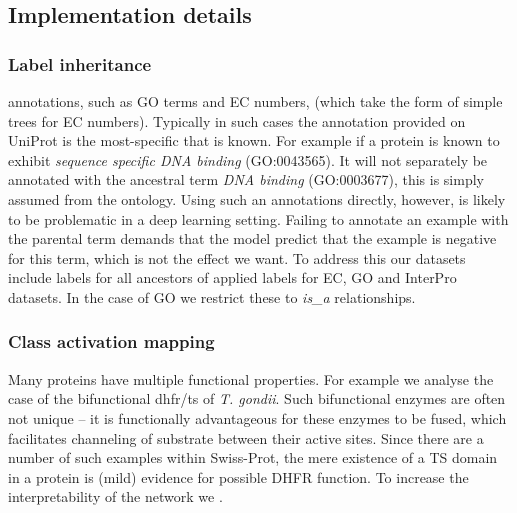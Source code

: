 \subsection*{Implementation details}


\subsubsection*{Label inheritance}
\DIFdelbegin {}\DIFdelend \DIFaddbegin {}\DIFaddend annotations, such as GO terms and EC numbers, \DIFdelbegin {}\DIFdelend \DIFaddbegin {}\DIFaddend (which take the form of simple trees for EC numbers). Typically in such cases the annotation provided on UniProt is the most-specific that is known. For example if a protein is known to exhibit \textit{sequence specific DNA binding} (GO:0043565). It will not separately be annotated with the ancestral term \textit{DNA binding} (GO:0003677), this is simply assumed from the ontology. Using such an annotations directly, however, is likely to be problematic in a deep learning setting. Failing to annotate an example with the parental term demands that the model predict that the example is negative for this term, which is not the effect we want.
To address this our datasets include labels for all ancestors of applied labels for EC, GO and InterPro datasets. In the case of GO we restrict these to \textit{is\_a} relationships.

\subsubsection*{Class activation mapping}
Many proteins have multiple functional properties. For example we analyse the case of the bifunctional dhfr/ts of \textit{T. gondii}. Such bifunctional enzymes are often not unique -- it is functionally advantageous for these enzymes to be fused, which facilitates channeling of substrate between their active sites. Since there are a number of such examples within Swiss-Prot, the mere existence of a TS domain in a protein is (mild) evidence for possible DHFR function. To increase the interpretability of the network we \DIFdelbegin {}\DIFdelend \DIFaddbegin {}\DIFaddend .


